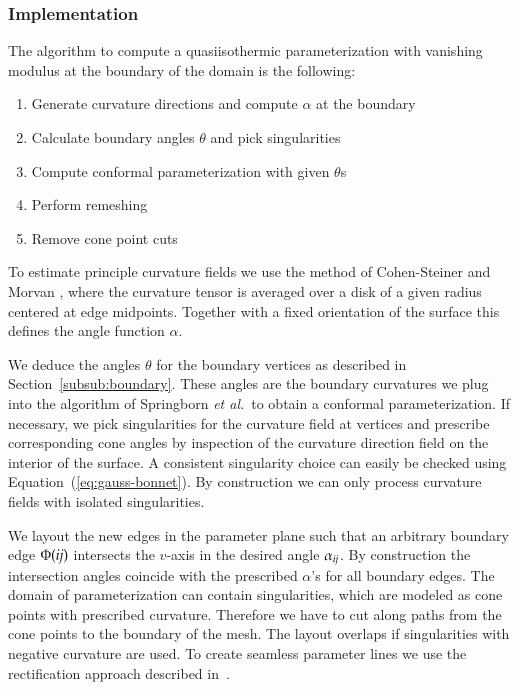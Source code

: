 \documentclass[Thesis.tex]{subfiles}
\begin{document}
\subsubsection{Implementation}
\label{subsub:parameterization}

The algorithm to compute a quasiisothermic parameterization with vanishing modulus at the 
boundary of the domain is the following:
\begin{enumerate}
\item Generate curvature directions and compute $\alpha$ at the boundary
\item Calculate boundary angles $\theta$ and pick singularities
\item Compute conformal parameterization with given $\theta$s
\item Perform remeshing
\item Remove cone point cuts 
\end{enumerate}

To estimate principle curvature fields we use the method of Cohen-Steiner and
Morvan \cite{CohMor03}, where the curvature tensor is averaged over a disk of a
given radius centered at edge midpoints. Together with a fixed orientation
of the surface this defines the angle function
$\alpha$. 

We deduce the angles $\theta$ for the boundary vertices as described in
Section~\ref{subsub:boundary}. These angles are the boundary curvatures we plug
into the algorithm of Springborn \emph{et al.}\ to obtain a conformal
parameterization. If necessary, we pick singularities for the curvature field at vertices
and prescribe corresponding cone angles by inspection of the curvature direction
field on the interior of the surface. A consistent singularity choice can
easily be checked using Equation~(\ref{eq:gauss-bonnet}). By construction we 
can only process curvature fields with isolated singularities.

We layout the new edges in the parameter plane such that an arbitrary 
boundary edge $\Phi(\mathrm{\it{ij}})$ intersects the $v$-axis in the desired angle 
$\alpha_{\mathrm{\it{ij}}}$. By construction
the intersection angles coincide with the prescribed $\alpha$'s for all
boundary edges. 
The domain of parameterization can contain singularities, which are
modeled as cone points with prescribed curvature. Therefore we have to 
cut along paths from the cone points to the boundary of the mesh. 
The layout overlaps if singularities with negative curvature are used. 
To create seamless parameter lines we use the rectification approach 
described in~\cite{Springborn2008}.
\end{document}

